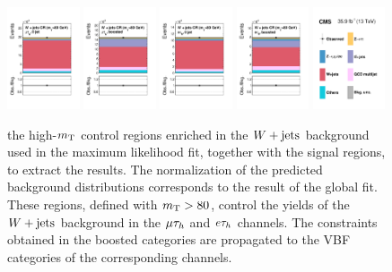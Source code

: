 \begin{figure}[!htbp]
\centering
     \includegraphics[width=0.19\textwidth]{higgs_to_taus/plots/Figure_002-a.pdf}
     \includegraphics[width=0.19\textwidth]{higgs_to_taus/plots/Figure_002-b.pdf}
     \includegraphics[width=0.19\textwidth]{higgs_to_taus/plots/Figure_002-c.pdf}
     \includegraphics[width=0.19\textwidth]{higgs_to_taus/plots/Figure_002-d.pdf}
     \includegraphics[width=0.19\textwidth]{higgs_to_taus/plots/Figure_002-e.pdf}
     \caption{the high-$m_\mathrm{T}$ control regions enriched in the $W+\text{jets}$ background used in 
the maximum likelihood fit, together with the signal regions, to extract the results. 
The normalization of the predicted background distributions corresponds to the result of 
the global fit. These regions, defined with $m_\mathrm{T}>80$\GeV, control the yields of the 
$W+\text{jets}$ background in the $\mu\tau_{h}$ and $e\tau_{h}$ channels.  
The constraints obtained in the boosted categories are propagated to the VBF categories 
of the corresponding channels.}
     \label{fig:htt_wj_CR1}
\end{figure}


